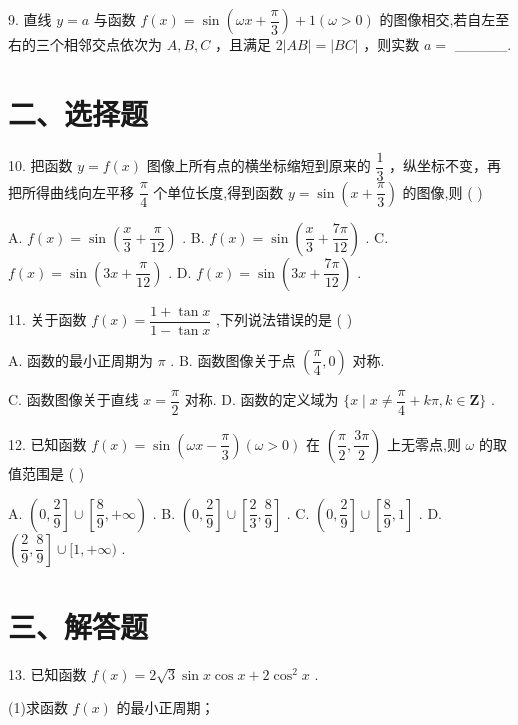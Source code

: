 9. 直线 $y = a$ 与函数 $f\left( x\right)  = \sin \left( {{\omega x} + \dfrac{\pi }{3}}\right)  + 1\left( {\omega  > 0}\right)$ 的图像相交,若自左至右的三个相邻交点依次为 $A,B,C$ ，且满足 $2\left| {AB}\right|  = \left| {BC}\right|$ ，则实数 $a =$ \_\_\_\_\_.

\section*{二、选择题}

10. 把函数 $y = f\left( x\right)$ 图像上所有点的横坐标缩短到原来的 $\dfrac{1}{3}$ ，纵坐标不变，再把所得曲线向左平移 $\dfrac{\pi }{4}$ 个单位长度,得到函数 $y = \sin \left( {x + \dfrac{\pi }{3}}\right)$ 的图像,则 ( )

A. $f\left( x\right)  = \sin \left( {\dfrac{x}{3} + \dfrac{\pi }{12}}\right)$ . B. $f\left( x\right)  = \sin \left( {\dfrac{x}{3} + \dfrac{7\pi }{12}}\right)$ . C. $f\left( x\right)  = \sin \left( {{3x} + \dfrac{\pi }{12}}\right)$ . D. $f\left( x\right)  = \sin \left( {{3x} + \dfrac{7\pi }{12}}\right)$ .

11. 关于函数 $f\left( x\right)  = \dfrac{1 + \tan x}{1 - \tan x}$ ,下列说法错误的是 ( )

A. 函数的最小正周期为 $\pi$ . B. 函数图像关于点 $\left( {\dfrac{\pi }{4},0}\right)$ 对称.

C. 函数图像关于直线 $x = \dfrac{\pi }{2}$ 对称. D. 函数的定义域为 $\{ x \mid  x \neq  \dfrac{\pi }{4} + {k\pi },k \in  \mathbf{Z}\}$ .

12. 已知函数 $f\left( x\right)  = \sin \left( {{\omega x} - \dfrac{\pi }{3}}\right) \left( {\omega  > 0}\right)$ 在 $\left( {\dfrac{\pi }{2},\dfrac{3\pi }{2}}\right)$ 上无零点,则 $\omega$ 的取值范围是 ( )

A. $\left( {0,\dfrac{2}{9}}\right\rbrack   \cup  \left\lbrack  {\dfrac{8}{9}, + \infty }\right)$ . B. $\left( {0,\dfrac{2}{9}}\right\rbrack   \cup  \left\lbrack  {\dfrac{2}{3},\dfrac{8}{9}}\right\rbrack$ . C. $\left( {0,\dfrac{2}{9}}\right\rbrack   \cup  \left\lbrack  {\dfrac{8}{9},1}\right\rbrack$ . D. $\left( {\dfrac{2}{9},\dfrac{8}{9}}\right\rbrack   \cup  \lbrack 1, + \infty )$ .

\section*{三、解答题}

13. 已知函数 $f\left( x\right)  = 2\sqrt{3}\sin x\cos x + 2{\cos }^{2}x$ .

(1)求函数 $f\left( x\right)$ 的最小正周期；

